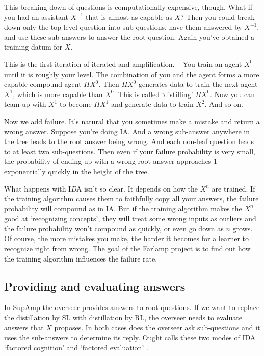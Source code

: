 \documentclass{farlamp}
\begin{document}
This breaking down of questions is computationally expensive, though. What if
you had an assistant $X^{-1}$ that is almost as capable as $X$? Then you could
break down only the top-level question into sub-questions, have them answered by
$X^{-1}$, and use these sub-answers to answer the root question. Again you've
obtained a training datum for $X$.

This is the first iteration of iterated  and amplification.
-- You train an agent $X^0$ until it is roughly your level. The combination of
you and the agent forms a more capable compound agent $HX^0$. Then $HX^0$
generates data to train the next agent $X^1$, which is more capable than $X^0$.
This is called ‘distilling’ $HX^0$. Now you can team up with $X^1$ to become
$HX^1$ and generate data to train $X^2$. And so on.

Now we add failure. It's natural that you sometimes make a mistake and return a
wrong answer. Suppose you're doing IA. And a wrong sub-answer anywhere in the
tree leads to the root answer being wrong. And each non-leaf question leads to
at least two sub-questions. Then even if your failure probability is very small,
the probability of ending up with a wrong root answer approaches 1 exponentially
quickly in the height of the tree.\parencite{ChriRelAmp}

What happens with I\emph{D}A isn't so clear. It depends on how the $X^n$ are
trained. If the training algorithm causes them to faithfully copy all your
answers, the failure probability will compound as in IA. But if the training
algorithm makes the $X^n$ good at ‘recognizing concepts’, they will treat some
wrong inputs as outliers and the failure probability won't compound as quickly,
or even go down as $n$ grows. Of course, the more mistakes you make, the harder
it becomes for a learner to recognize right from wrong. The goal of the Farlamp
project is to find out how the training algorithm influences the failure rate.


\subsection{Providing and evaluating answers}

In SupAmp \parencite{CSASupAmp} the overseer provides answers to root questions.
If we want to replace the distillation by SL with distillation by RL, the
overseer needs to evaluate answers that $X$ proposes. In both cases does the
overseer ask sub-questions and it uses the sub-answers to determine its reply.
Ought calls these two modes of IDA \parencite[see][]{CotrIDA} ‘factored
cognition’ \parencite{StuhFacCog} and ‘factored evaluation’
\parencite{StuhDelCog}.
\end{document}
